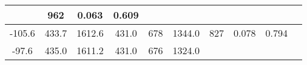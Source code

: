 \documentclass[a4paper,10pt]{article}
\begin{document}
\begin{longtable}{
     |
%    
    c|
%    
    c|
%    
    c|
%    
    c|
%    
    c|
%    
    c|
%    
    c|
%    
    c|
%    
    c|
%    
    c|
%    
    }
%        
        & 962
%        

%        

%        
        & 0.063
%        

%        

%        
        & 0.609
%        

%        
        \\
        \hline

        

%        

%        
        -105.6
%        

%        

%        
        & 433.7
%        

%        

%        
        & 1612.6
%        

%        

%        
        & 431.0
%        

%        

%        
        & 678
%        

%        

%        
        & 1344.0
%        

%        

%        
        & 827
%        

%        

%        
        & 0.078
%        

%        

%        
        & 0.794
%        

%        
        \\
        \hline

        

%        

%        
        -97.6
%        

%        

%        
        & 435.0
%        

%        

%        
        & 1611.2
%        

%        

%        
        & 431.0
%        

%        

%        
        & 676
%        

%        

%        
        & 1324.0
%        

%        


\end{longtable}
\end{document}
